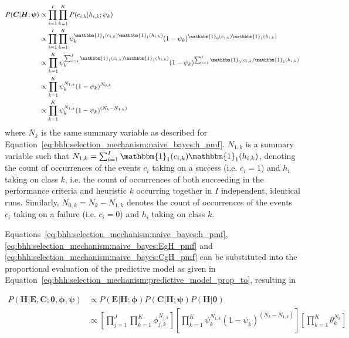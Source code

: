 \documentclass[preprint,review,12pt]{elsarticle}
\begin{document}
\begin{equation}
	\label{eq:bhh:selection_mechanism:naive_bayes:CgH_pmf}
	\begin{split}
		P(\boldsymbol{C} \vert \boldsymbol{H}; \boldsymbol{\psi})
		&\propto\prod_{i=1}^{I} \prod_{k=1}^{K} P(c_{i,k} \vert h_{i,k} ; \psi_{k})  \\
		&\propto \prod_{i=1}^{I} \prod_{k=1}^{K} \psi_{k}^{\mathbbm{1}_{1}(c_{i,k})\mathbbm{1}_{1}(h_{i,k})} (1 - \psi_{k})^{\mathbbm{1}_{0}(c_{i,k})\mathbbm{1}_{1}(h_{i,k})}\\
		&\propto \prod_{k=1}^{K} \psi_{k}^{\sum_{i=1}^{I} \mathbbm{1}_{1}(c_{i,k})\mathbbm{1}_{1}(h_{i,k})} (1 - \psi_{k})^{\sum_{i=1}^{I} \mathbbm{1}_{0}(c_{i,k})\mathbbm{1}_{1}(h_{i,k})}\\
		&\propto \prod_{k=1}^{K} \psi_{k}^{N_{1,k}} (1 - \psi_{k})^{N_{0,k}} \\
		&\propto \prod_{k=1}^{K} \psi_{k}^{N_{1,k}} (1 - \psi_{k})^{(N_{k} - N_{1,k})}
	\end{split}
\end{equation}
\noindent
where $N_{k}$ is the same summary variable as described for Equation~\eqref{eq:bhh:selection_mechanism:naive_bayes:h_pmf}. $N_{1,k}$ is a summary variable such that $N_{1,k} = \sum_{i=1}^{I} \mathbbm{1}_{1}(c_{i,k})\mathbbm{1}_{1}(h_{i,k})$, denoting the count of occurrences of the events $c_{i}$ taking on a success (i.e. $c_{i}=1$) and $h_{i}$ taking on class $k$, i.e. the count of occurrences of both succeeding in the performance criteria and heuristic $k$ occurring together in $I$ independent, identical runs. Similarly, $N_{0,k} = N_{k} - N_{1,k}$ denotes the count of occurrences of the events $c_{i}$ taking on a failure (i.e. $c_{i}=0$) and $h_{i}$ taking on class $k$.

Equations~\eqref{eq:bhh:selection_mechanism:naive_bayes:h_pmf}, \eqref{eq:bhh:selection_mechanism:naive_bayes:EgH_pmf} and \eqref{eq:bhh:selection_mechanism:naive_bayes:CgH_pmf} can be substituted into the proportional evaluation of the predictive model as given in Equation~\eqref{eq:bhh:selection_mechanism:predictive_model_prop_to}, resulting in

\begin{equation}
	\label{eq:bhh:selection_mechanism:naive_bayes:HgEC_pmf}
	\begin{split}
		P(\boldsymbol{H} \vert \boldsymbol{E}, \boldsymbol{C};  \boldsymbol{\theta}, \boldsymbol{\phi}, \boldsymbol{\psi})
		&\propto P(\boldsymbol{E} \vert \boldsymbol{H};  \boldsymbol{\phi})  P(\boldsymbol{C} \vert \boldsymbol{H}; \boldsymbol{\psi}) P(\boldsymbol{H} \vert \boldsymbol{\theta})  \\
		&\propto \left[ \prod_{j=1}^{J} \prod_{k=1}^{K} \phi_{j,k}^{N_{j,k}} \right] \left[ \prod_{k=1}^{K} \psi_{k}^{N_{1,k}} (1 - \psi_{k})^{(N_{k} - N_{1,k})} \right] \left[ \prod_{k=1}^{K} \theta_{k}^{N_{k}} \right]
	\end{split}
\end{equation}
\end{document}
